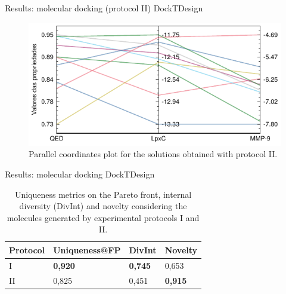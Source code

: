\documentclass[aspectratio=169,xcolor=dvipsnames]{beamer}
\begin{document}


\begin{frame}{Results: molecular docking (protocol II) \hfill {\footnotesize \alert{DockTDesign}}}
    \begin{figure}
        \centering
        \includegraphics[width=.8\textwidth]{imgs/results/protocol2-parallel-coords}
        \caption{Parallel coordinates plot for the solutions obtained with protocol II.}
    \end{figure}
\end{frame}



\begin{frame}{Results: molecular docking \hfill {\footnotesize \alert{DockTDesign}}}
    \begin{table}
        \centering
        \caption{Uniqueness metrics on the Pareto front, internal diversity (DivInt) and novelty considering the molecules generated by experimental protocols I and II.}
        \begin{tabular}{@{}llll@{}}
            \toprule
            Protocol & Uniqueness@FP  & DivInt         & Novelty        \\ \midrule
            I        & \textbf{0,920} & \textbf{0,745} & 0,653          \\
            II       & 0,825          & 0,451          & \textbf{0,915} \\ \bottomrule
        \end{tabular}
    \end{table}
\end{frame}
\end{document}

